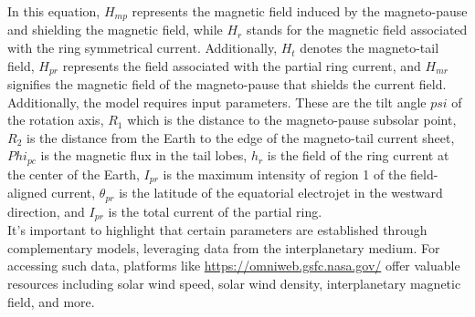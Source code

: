 \documentclass[12pt]{article}
\begin{document}
In this equation, $H_{mp}$ represents the magnetic field induced by the magneto-pause and shielding the magnetic field, while $H_r$ stands for the magnetic field associated with the ring symmetrical current. Additionally, $H_t$ denotes the magneto-tail field, $H_{pr}$ represents the field associated with the partial ring current, and $ H_{mr}$ signifies the magnetic field of the magneto-pause that shields the current field. \\

Additionally, the model requires input parameters. These are the tilt angle $psi$ of the rotation axis, $R_1$ which is the distance to the magneto-pause subsolar point, $R_2$ is the distance from the Earth to the edge of the magneto-tail current sheet, $Phi_{pc}$ is the magnetic flux in the tail lobes, $h_r$ is the field of the ring current at the center of the Earth, $I_{pr}$ is the maximum intensity of region 1 of the field-aligned current, $\theta_{pr}$ is the latitude of the equatorial electrojet in the westward direction, and $I_{pr}$ is the total current of the partial ring. \\

It's important to highlight that certain parameters are established through complementary models, leveraging data from the interplanetary medium. For accessing such data, platforms like \url{https://omniweb.gsfc.nasa.gov/} offer valuable resources including solar wind speed, solar wind density, interplanetary magnetic field, and more.\\
\end{document}
